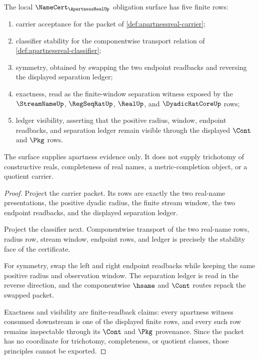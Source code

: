\begin{theorem}
\label{thm:apartnessreal-namecert-obligation-surface}
The local $\NameCert_{\ApartnessRealUp}$ obligation surface has five finite rows:
\begin{enumerate}
\item carrier acceptance for the packet of \autoref{def:apartnessreal-carrier};
\item classifier stability for the componentwise transport relation of \autoref{def:apartnessreal-classifier};
\item symmetry, obtained by swapping the two endpoint readbacks and reversing the displayed separation ledger;
\item exactness, read as the finite-window separation witness exposed by the $\StreamNameUp$, $\RegSeqRatUp$, $\RealUp$, and $\DyadicRatCoreUp$ rows;
\item ledger visibility, asserting that the positive radius, window, endpoint readbacks, and separation ledger remain visible through the displayed $\Cont$ and $\Pkg$ rows.
\end{enumerate}
The surface supplies apartness evidence only. It does not supply trichotomy of constructive reals, completeness of real names, a metric-completion object, or a quotient carrier.
\end{theorem}
\begin{proof}
Project the carrier packet. Its rows are exactly the two real-name presentations, the positive dyadic radius, the finite stream window, the two endpoint readbacks, and the displayed separation ledger.

Project the classifier next. Componentwise transport of the two real-name rows, radius row, stream window, endpoint rows, and ledger is precisely the stability face of the certificate.

For symmetry, swap the left and right endpoint readbacks while keeping the same positive radius and observation window. The separation ledger is read in the reverse direction, and the componentwise $\hsame$ and $\Cont$ routes repack the swapped packet.

Exactness and visibility are finite-readback claims: every apartness witness consumed downstream is one of the displayed finite rows, and every such row remains inspectable through its $\Cont$ and $\Pkg$ provenance. Since the packet has no coordinate for trichotomy, completeness, or quotient classes, those principles cannot be exported.
\end{proof}

